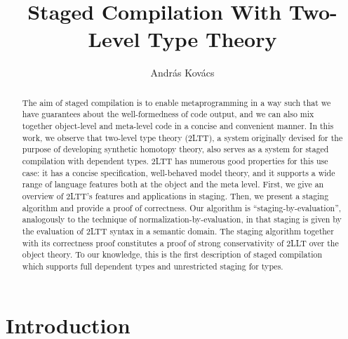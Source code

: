 \documentclass[acmsmall]{acmart}
\theoremstyle{remark}
\begin{document}
\title{Staged Compilation With Two-Level Type Theory}

\author{András Kovács}

\begin{abstract}
  The aim of staged compilation is to enable metaprogramming in a way such that
  we have guarantees about the well-formedness of code output, and we can also
  mix together object-level and meta-level code in a concise and convenient
  manner. In this work, we observe that two-level type theory (2LTT), a system
  originally devised for the purpose of developing synthetic homotopy theory,
  also serves as a system for staged compilation with dependent types. 2LTT has
  numerous good properties for this use case: it has a concise specification,
  well-behaved model theory, and it supports a wide range of language features
  both at the object and the meta level. First, we give an overview of 2LTT's
  features and applications in staging. Then, we present a staging algorithm and
  provide a proof of correctness. Our algorithm is ``staging-by-evaluation'',
  analogously to the technique of normalization-by-evaluation, in that staging
  is given by the evaluation of 2LTT syntax in a semantic domain. The staging
  algorithm together with its correctness proof constitutes a proof of strong
  conservativity of 2LLT over the object theory. To our knowledge, this is the
  first description of staged compilation which supports full dependent types and
  unrestricted staging for types.
\end{abstract}

\begin{CCSXML}
\end{CCSXML}

\maketitle

\section{Introduction}\label{sec:introduction}
\end{document}
